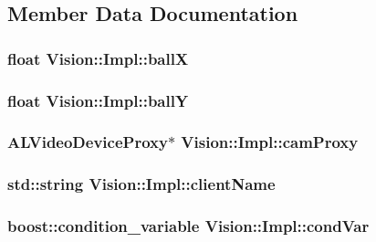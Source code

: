 \subsection{Member Data Documentation}
\hypertarget{structVision_1_1Impl_ab294e440804f7b5a928c0562efa33d03}{
\subsubsection[{ball\-X}]{\setlength{\rightskip}{0pt plus 5cm}float Vision\-::\-Impl\-::ball\-X}}\label{structVision_1_1Impl_ab294e440804f7b5a928c0562efa33d03}
\hypertarget{structVision_1_1Impl_a02cf2f4c251c351704465f4ce5319046}{
\subsubsection[{ball\-Y}]{\setlength{\rightskip}{0pt plus 5cm}float Vision\-::\-Impl\-::ball\-Y}}\label{structVision_1_1Impl_a02cf2f4c251c351704465f4ce5319046}
\hypertarget{structVision_1_1Impl_a374e531e8ef64f468bcb097be04a47aa}{
\subsubsection[{cam\-Proxy}]{\setlength{\rightskip}{0pt plus 5cm}A\-L\-Video\-Device\-Proxy$\ast$ Vision\-::\-Impl\-::cam\-Proxy}}\label{structVision_1_1Impl_a374e531e8ef64f468bcb097be04a47aa}
\hypertarget{structVision_1_1Impl_a2b57273c099bd98d822ccec7e016b3bf}{
\subsubsection[{client\-Name}]{\setlength{\rightskip}{0pt plus 5cm}std\-::string Vision\-::\-Impl\-::client\-Name}}\label{structVision_1_1Impl_a2b57273c099bd98d822ccec7e016b3bf}
\hypertarget{structVision_1_1Impl_abc067b6bea87f82e9b64196663f0ba4c}{
\subsubsection[{cond\-Var}]{\setlength{\rightskip}{0pt plus 5cm}boost\-::condition\-\_\-variable Vision\-::\-Impl\-::cond\-Var}}\label{structVision_1_1Impl_abc067b6bea87f82e9b64196663f0ba4c}

